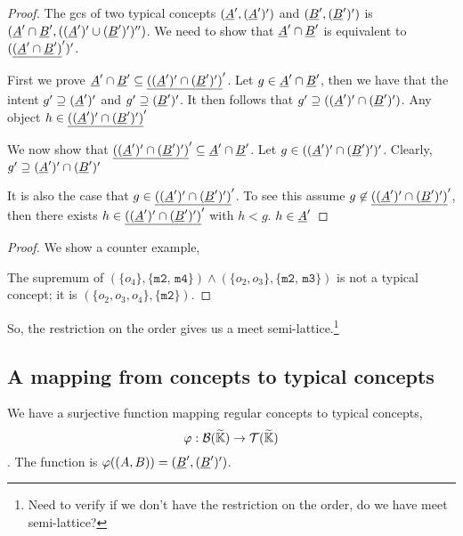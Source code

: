 \documentclass[11pt]{article}
\begin{document}
\begin{proof}
  The gcs of two typical concepts $(\underline{A}', (\underline{A}')')$ and $(\underline{B}',(\underline{B}')')$ is $(\underline{A}' \cap \underline{B}', ((\underline{A}')' \cup (\underline{B}')')'')$. We need to show that $\underline{A}' \cap \underline{B}'$ is equivalent to $(\underline{(\underline{A}' \cap \underline{B}')}')'$.

  First we prove $\underline{A}' \cap \underline{B}' \subseteq \underline{((\underline{A}')' \cap (\underline{B}')')}'$. Let $g \in \underline{A}' \cap \underline{B}'$, then we have that the intent $g' \supseteq (\underline{A}')'$ and $g' \supseteq (\underline{B}')'$. It then follows that $g' \supseteq ((\underline{A}')' \cap (\underline{B}')')$. Any object $h \in \underline{((\underline{A}')' \cap (\underline{B}')')}'$

  We now show that $\underline{((\underline{A}')' \cap (\underline{B}')')}' \subseteq \underline{A}' \cap \underline{B}'$. Let $g \in ((\underline{A}')' \cap (\underline{B}')')'$. Clearly, $g' \supseteq (\underline{A}')' \cap (\underline{B}')'$

  It is also the case that $g \in \underline{((\underline{A}')' \cap (\underline{B}')')}'$. To see this assume $g \not \in \underline{((\underline{A}')' \cap (\underline{B}')')}'$, then there exists $h\in \underline{((\underline{A}')' \cap (\underline{B}')')}'$ with $h < g$. $h \in \underline{A}'$


\end{proof}

\begin{proof}

  We show a counter example,

  The supremum of $(\{o_4\}, \{\texttt{m2, m4}\}) \wedge (\{o_2, o_3\}, \{\texttt{m2, m3}\})$ is not a typical concept; it is $(\{o_2, o_3, o_4\}, \{\texttt{m2}\})$.
\end{proof}

So, the restriction on the order gives us a meet semi-lattice.\footnote{Need to verify if we don't have the restriction on the order, do we have meet semi-lattice?}

\subsection{A mapping from concepts to typical concepts}

We have a surjective function mapping regular concepts to typical concepts, \[\varphi : \mathcal{B}(\widetilde{\mathbb{K}}) \to \mathcal{T}(\widetilde{\mathbb{K}})\]. The function is $\varphi((A, B)) = (\underline{B}', (\underline{B}')')$.

\clearpage

\end{document}
